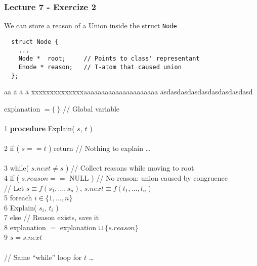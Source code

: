 \begin{frame}[fragile]
  \frametitle{Lecture 7 - Exercize 2}
  
  \scriptsize

  We can store a reason of a Union inside the struct \verb|Node|

  \begin{verbatim}
  struct Node { 
    ...
    Node *  root;     // Points to class' representant
    Enode * reason;   // T-atom that caused union
  };
  \end{verbatim} 

  \begin{tabbing}
  aa \= a \= a \= a \= xxxxxxxxxxxxxxaaaaaaaaaaaaaaaaaaaaa \= asdasdasdasdasdasdasdasdasd \kill

     \> explanation $= \{\ \}$ \> \> \> \> // Global variable \\
   \\
   1 \> {\bf procedure} Explain( $s$, $t$ ) \\
   \\
   2 \> if ( $s == t$ ) return           \> \> \> \> // Nothing to explain \ldots \\
   \\
   3 \> while( $s.next \not= s$ )        \> \> \> \> // Collect reasons while moving to root \\
   4 \> \> if ( $s.reason == $ NULL )       \> \> \> // No reason: union caused by congruence \\
     \> \> \> // Let $s \equiv f( s_1, \ldots, s_n )$, $s.next \equiv f( t_1, \ldots, t_n )$ \\
   5 \> \> \> foreach $i \in \{ 1, \ldots, n \}$ \\
   6 \> \> \> \> Explain( $s_i$, $t_i$ ) \\
   7 \> \> else                             \> \> \> // Reason exists, save it \\
   8 \> \> \> explanation $=$ explanation $\cup\ \{ s.reason \}$ \\ 
   9 \> \> $s = s.next$ \\
   \\
   // Same ``while'' loop for $t$ \ldots

  \end{tabbing}

\end{frame}
